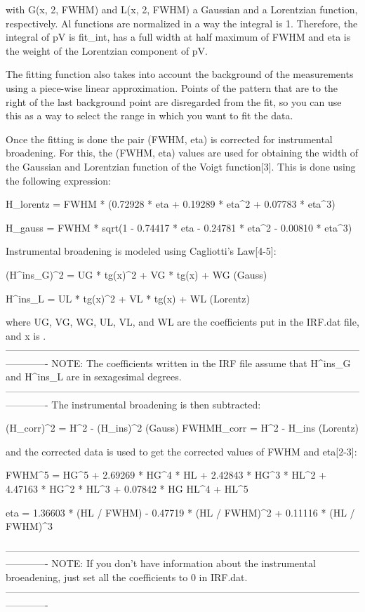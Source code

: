 with G(x, 2\theta, FWHM) and L(x, 2\theta, FWHM) a Gaussian and a Lorentzian function, respectively. Al functions are normalized in a way the integral is 1. Therefore, the integral of pV is fit_int, has a full width at half maximum of FWHM and eta is the weight of the Lorentzian component of pV.

The fitting function also takes into account the background of the measurements using a piece-wise linear approximation. Points of the pattern that are to the right of the last background point are disregarded from the fit, so you can use this as a way to select the range in which you want to fit the data.

Once the fitting is done the pair (FWHM, eta) is corrected for instrumental broadening. For this, the (FWHM, eta) values are used for obtaining the width of the Gaussian and Lorentzian function of the Voigt function[3]. This is done using the following expression:

H_{lorentz} = FWHM * (0.72928 * eta + 0.19289 * eta^2 + 0.07783 * eta^3)

H_{gauss} = FWHM * sqrt(1 - 0.74417 * eta - 0.24781 * eta^2 - 0.00810 * eta^3)

Instrumental broadening is modeled using Cagliotti's Law[4-5]:

(H^ins_G)^2 = UG * tg(x)^2 + VG * tg(x) + WG (Gauss)

H^ins_L = UL * tg(x)^2 + VL * tg(x) + WL (Lorentz)

where UG, VG, WG, UL, VL, and WL are the coefficients put in the IRF.dat file, and x is \theta.
-------------------------------------------------------------------------------------------------------------------------
NOTE: The coefficients written in the IRF file assume that H^ins_G and H^ins_L are in sexagesimal degrees.
-------------------------------------------------------------------------------------------------------------------------
The instrumental broadening is then subtracted:

(H_corr)^2 = H^2 - (H_ins)^2 (Gauss)
FWHMH_corr = H^2 - H_ins (Lorentz)

and the corrected data is used to get the corrected values of FWHM and eta[2-3]:

FWHM^5 = HG^5 + 2.69269 * HG^4 * HL + 2.42843 * HG^3 * HL^2 + 4.47163 * HG^2 * HL^3 + 0.07842 * HG HL^4 + HL^5

eta = 1.36603 * (HL / FWHM) - 0.47719 * (HL / FWHM)^2 + 0.11116 * (HL / FWHM)^3

-------------------------------------------------------------------------------------------------------------------------
NOTE: If you don't have information about the instrumental broeadening, just set all the coefficients to 0 in IRF.dat.
-------------------------------------------------------------------------------------------------------------------------
 
